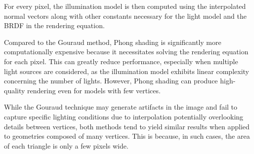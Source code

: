 For every pixel, the illumination model is then computed using the interpolated normal vectors along with other constants necessary for the light model and the BRDF in the rendering equation.

Compared to the Gouraud method, Phong shading is significantly more computationally expensive because it necessitates solving the rendering equation for each pixel. 
This can greatly reduce performance, especially when multiple light sources are considered, as the illumination model exhibits linear complexity concerning the number of lights.
However, Phong shading can produce high-quality rendering even for models with few vertices.

While the Gouraud technique may generate artifacts in the image and fail to capture specific lighting conditions due to interpolation potentially overlooking details between vertices, both methods tend to yield similar results when applied to geometries composed of many vertices. 
This is because, in such cases, the area of each triangle is only a few pixels wide.